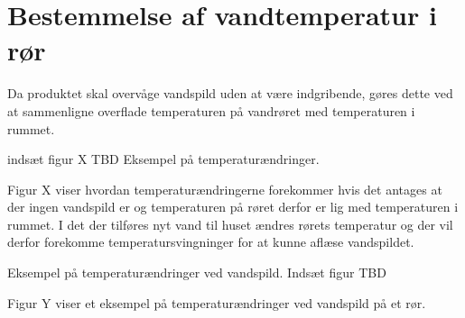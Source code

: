 \section{Bestemmelse af vandtemperatur i rør}
Da produktet skal overvåge vandspild uden at være indgribende, gøres dette ved at sammenligne overflade temperaturen på vandrøret med temperaturen i rummet. 


indsæt figur X TBD
Eksempel på temperaturændringer.

Figur X viser hvordan temperaturændringerne forekommer hvis det antages at der ingen vandspild er og temperaturen på røret derfor er lig med temperaturen i rummet. I det der tilføres nyt vand til huset ændres rørets temperatur og der vil derfor forekomme temperatursvingninger for at kunne aflæse vandspildet.






Eksempel på temperaturændringer ved vandspild.
Indsæt figur TBD

Figur Y viser et eksempel på temperaturændringer ved vandspild på et rør. 



    